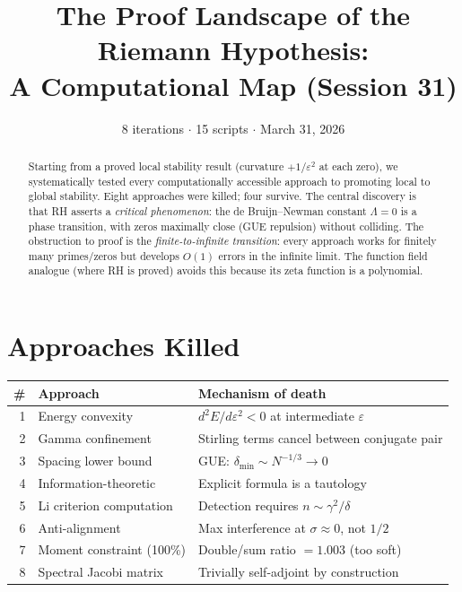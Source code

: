 \documentclass[11pt]{article}
\title{The Proof Landscape of the Riemann Hypothesis:\\A Computational Map (Session 31)}
\author{8 iterations $\cdot$ 15 scripts $\cdot$ March 31, 2026}
\date{}
\begin{document}
\maketitle

\begin{abstract}
Starting from a proved local stability result (curvature $+1/\varepsilon^2$ at each zero), we systematically tested every computationally accessible approach to promoting local to global stability. Eight approaches were killed; four survive. The central discovery is that RH asserts a \emph{critical phenomenon}: the de Bruijn--Newman constant $\Lambda = 0$ is a phase transition, with zeros maximally close (GUE repulsion) without colliding. The obstruction to proof is the \emph{finite-to-infinite transition}: every approach works for finitely many primes/zeros but develops $O(1)$ errors in the infinite limit. The function field analogue (where RH is proved) avoids this because its zeta function is a polynomial.
\end{abstract}

\section{Approaches Killed}
\begin{center}
\begin{tabular}{rlp{7.5cm}}
\toprule
\# & Approach & Mechanism of death \\
\midrule
1 & Energy convexity & $d^2E/d\varepsilon^2 < 0$ at intermediate $\varepsilon$ \\
2 & Gamma confinement & Stirling terms cancel between conjugate pair \\
3 & Spacing lower bound & GUE: $\delta_{\min} \sim N^{-1/3} \to 0$ \\
4 & Information-theoretic & Explicit formula is a tautology \\
5 & Li criterion computation & Detection requires $n \sim \gamma^2/\delta$ \\
6 & Anti-alignment & Max interference at $\sigma \approx 0$, not $1/2$ \\
7 & Moment constraint (100\%) & Double/sum ratio $= 1.003$ (too soft) \\
8 & Spectral Jacobi matrix & Trivially self-adjoint by construction \\
\bottomrule
\end{tabular}
\end{center}
\end{document}
